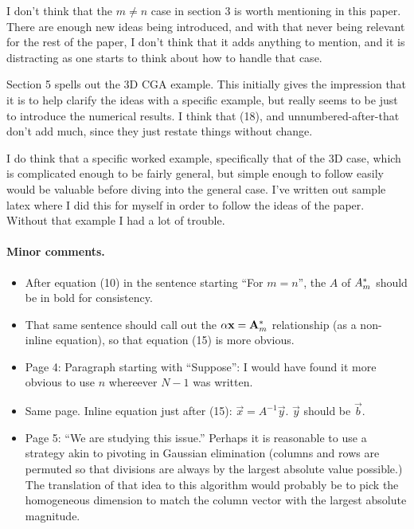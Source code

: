 I don't think that the \( m \ne n \) case in section 3 is worth mentioning in this paper.  There are enough new ideas being introduced, and with that never being relevant for the rest of the paper, I don't think that it adds anything to mention, and it is distracting as one starts to think about how to handle that case.

Section 5 spells out the 3D CGA example.  This initially gives the impression that it is to help clarify the ideas with a specific example, but really seems to be just to introduce the numerical results.  I think that (18), and unnumbered-after-that don't add much, since they just restate things without change.

I do think that a specific worked example, specifically that of the 3D case, which is complicated enough to be fairly general, but simple enough to follow easily would be valuable before diving into the general case.  I've written out sample latex where I did this for myself in order to follow the ideas of the paper.  Without that example I had a lot of trouble.

\paragraph{Minor comments.}

\begin{itemize}
\item After equation (10) in the sentence starting ``For \(m = n\)'', the \( A \) of \(A_m^{*}\) should be in bold for consistency.
\item That same sentence should call out the \( \alpha \mathbf{x} = \mathbf{A}_m^{*} \) relationship (as a non-inline equation), so that equation (15) is more obvious.
\item Page 4: Paragraph starting with ``Suppose'': I would have found it more obvious to use \( n \) whereever \( N -1 \) was written.
\item Same page.  Inline equation just after (15): \( \vec{x} = A^{-1} \vec{y} \).  \( \vec{y} \) should be \( \vec{b}\).
\item Page 5: ``We are studying this issue.''  Perhaps it is reasonable to use a strategy akin to pivoting in Gaussian elimination (columns and rows are permuted so that divisions are always by the largest absolute value possible.)  The translation of that idea to this algorithm would probably be to pick the homogeneous dimension to match the column vec{t}or with the largest absolute magnitude.
\end{itemize}

